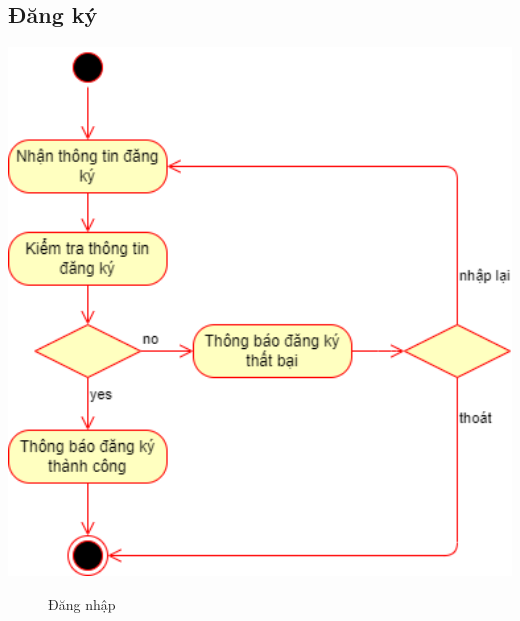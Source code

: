 \subsection{Đăng ký}
  \begin{center}
    \includegraphics[width=1.1\textwidth]{image/activity/logup.png}
    \begin{figure}
      \centering
      \caption{Đăng nhập}
    \end{figure}
  \end{center}

